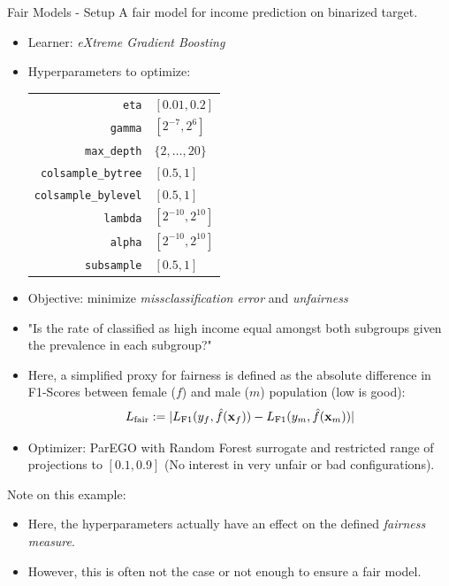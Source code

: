 \begin{frame}[allowframebreaks]{Fair Models - Setup}
  A fair model for income prediction on binarized target.
\begin{itemize}
  \item Learner: \emph{eXtreme Gradient Boosting}
  \item Hyperparameters to optimize: \\
  \begin{tabular}{rl}
    \texttt{eta} & $[0.01,0.2]$ \\
    \texttt{gamma} & $[2^{-7},2^6]$ \\
    \texttt{max\_depth} & $\{2, \ldots, 20\}$ \\
    \texttt{colsample\_bytree} & $[0.5,1]$ \\
    \texttt{colsample\_bylevel} & $[0.5,1]$ \\
    \texttt{lambda} & $[2^{-10},2^{10}]$ \\
    \texttt{alpha} & $[2^{-10},2^{10}]$ \\
    \texttt{subsample} & $[0.5,1]$ \\
  \end{tabular}
  \item Objective: minimize \emph{missclassification error} and \emph{unfairness}
  \item "Is the rate of classified as high income equal amongst both subgroups given the prevalence in each subgroup?"
  \item Here, a simplified proxy for fairness is defined as the absolute difference in F1-Scores between female ($f$) and male ($m$) population (low is good):
  \[
  L_{\text{fair}} := |L_{\text{F1}}(y_f,\hat{f}(\mathbf{x}_f)) - L_{\text{F1}}(y_m,\hat{f}(\mathbf{x}_m))|
  \]
  \item Optimizer: ParEGO with Random Forest surrogate and restricted range of projections to $[0.1, 0.9]$ (No interest in very unfair or bad configurations).
\end{itemize}
\vspace{1em}
Note on this example:
\begin{itemize}
  \item Here, the hyperparameters actually have an effect on the defined \emph{fairness measure}.
  \item However, this is often not the case or not enough to ensure a fair model.
\end{itemize}

\end{frame}

